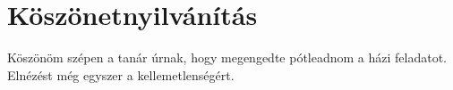 \chapter*{Köszönetnyilvánítás}

Köszönöm szépen a tanár úrnak, hogy megengedte pótleadnom a házi feladatot. Elnézést még egyszer a kellemetlenségért.